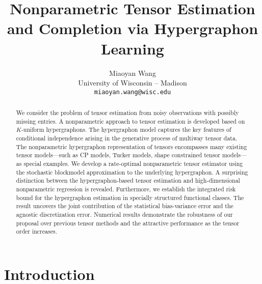 \documentclass{article}
\title{Nonparametric Tensor Estimation and Completion via Hypergraphon Learning}
\author{%
Miaoyan Wang \\
 University of Wisconsin -- Madison\\
\texttt{miaoyan.wang@wisc.edu}
}
\begin{document}
\maketitle


\begin{abstract}
We consider the problem of tensor estimation from noisy observations with possibly missing entries. A nonparametric approach to tensor estimation is developed based on $K$-uniform hypergraphons. The hypergraphon model captures the key features of conditional independence arising in the generative process of multiway tensor data. The nonparametric hypergraphon representation of tensors encompasses many existing tensor models---such as CP models, Tucker models, shape constrained tensor models---as special examples. We develop a rate-optimal nonparametric tensor estimator using the stochastic blockmodel approximation to the underlying hypergraphon. A surprising distinction between the hypergraphon-based tensor estimation and high-dimensional nonparametric regression is revealed. Furthermore, we establish the integrated risk bound for the hypergraphon estimation in specially structured functional classes. The result uncovers the joint contribution of the statistical bias-variance error and the agnostic discretization error. Numerical results demonstrate the robustness of our proposal over previous tensor methods and the attractive performance as the tensor order increases.
\end{abstract}

\section{Introduction}
\end{document}
